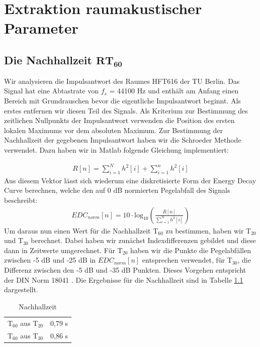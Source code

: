 \chapter{Extraktion raumakustischer Parameter}
\section{Die Nachhallzeit $\mathbf{RT_{60}}$}
\label{sec:rt60}
Wir analysieren die Impulsantwort des Raumes HFT616 der TU Berlin.
Das Signal hat eine Abtastrate von $f_s$ = 44100 Hz und enthält am Anfang einen Bereich mit Grundrauschen bevor die eigentliche Impulsantwort beginnt.
Als erstes entfernen wir diesen Teil des Signals.
Als Kriterium zur Bestimmung des zeitlichen Nullpunkts der Impulsantwort verwenden die Position des ersten lokalen Maximums vor dem absoluten Maximum.
Zur Bestimmung der Nachhallzeit der gegebenen Impulsantwort haben wir die Schroeder Methode \cite{Schroeder65} verwendet.
Dazu haben wir in Matlab folgende Gleichung implementiert:

\begin{align*}
R[n] = \sum_{i=1}^N h^2[i] + \sum_{i=1}^n h^2[i]
\end{align*}
Aus diesem Vektor lässt sich wiederum eine diskretisierte Form der Energy Decay Curve berechnen, welche den auf 0 dB normierten Pegelabfall des Signals  beschreibt:
\begin{align*}
EDC_{norm}[n] = 10 \cdot \mathrm{log}_{10} \left(\frac{R[n]}{\sum_{i=1}^N h^2[i]}\right)
\end{align*}
Um daraus nun einen Wert für die Nachhallzeit T$_{60}$ zu bestimmen, haben wir T$_{20}$ und T$_{30}$ berechnet.
Dabei haben wir zunächst Indexdifferenzen gebildet und diese dann in Zeitwerte umgerechnet.
Für T$_{20}$ haben wir die Punkte die Pegelabfällen zwischen -5 dB und -25 dB in $EDC_{norm}[n]$ entsprechen verwendet, für T$_{30}$, die Differenz zwischen den -5 dB und -35 dB Punkten.
Dieses Vorgehen entspricht der DIN Norm 18041 \cite{DIN_18041}.
Die Ergebnisse für die Nachhallzeit sind in Tabelle \ref{tab:T} dargestellt.

\begin{table}[H]
\centering
\caption{Nachhallzeit}
\label{tab:T}
\begin{tabular}{ | c | c |}
  \hline
  T$_{60}$ aus T$_{20}$ &  0,79 s \\
  T$_{60}$ aus T$_{30}$ &  0,86 s \\
  \hline
  \end{tabular}
\end{table}


